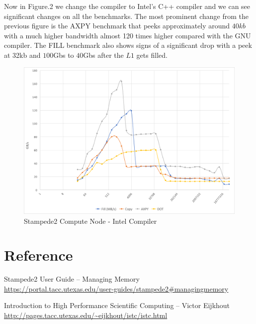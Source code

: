\documentclass[12pt]{article} %
\begin{document}
\newpage

Now in Figure.2 we change the compiler to Intel's C++ compiler and we can see significant changes on all the benchmarks. The most prominent change from the previous figure is the \textsc{AXPY}  benchmark that peeks approximately around $40kb$ with a much higher bandwidth almost 120 times higher compared with the GNU compiler.  The \textsc{FILL} benchmark also shows signs of a significant drop with a peek at 32kb and $100$Gb\/s to $40$Gb\/s  after the $L1$ gets filled.

\begin{figure}[htb]
\caption{Stampede2 Compute Node - Intel Compiler}\label{fig:benchmark02}
\centering
\includegraphics[width=\textwidth,keepaspectratio]{imgs/img02.png}
\end{figure}

\newpage


\section{Reference}

\begin{flushleft}
Stampede2 User Guide -- Managing Memory \\ \url{https://portal.tacc.utexas.edu/user-guides/stampede2#managingmemory}

Introduction to High Performance Scientific Computing -- Victor Eijkhout \\ \url{http://pages.tacc.utexas.edu/~eijkhout/istc/istc.html}
\end{flushleft}
\end{document}
